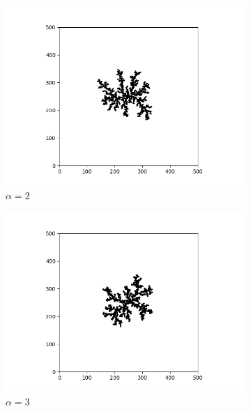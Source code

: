 \documentclass[aps,preprint,groupedaddress,letterpaper]{revtex4-1}
\begin{document}
\begin{figure}[h]
     \centering
     \begin{subfigure}[h]{0.23\textwidth}
         \centering
         \includegraphics[width=\textwidth]{img/alpha/2.png}
         \caption{$\alpha = 2$}
         \label{al3}
     \end{subfigure}
     \hfill
     \begin{subfigure}[h]{0.23\textwidth}
         \centering
         \includegraphics[width=\textwidth]{img/alpha/3.png}
         \caption{$\alpha = 3$}
         \label{al5}
     \end{subfigure}
     \hfill
     \begin{subfigure}[h]{0.23\textwidth}
         \centering

\end{subfigure}
\end{figure}
\end{document}
